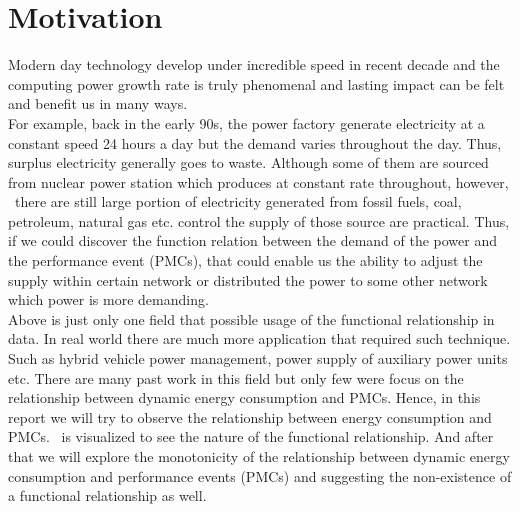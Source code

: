 \section{Motivation}
Modern day technology develop under incredible speed in recent decade and the computing power growth rate is truly phenomenal and lasting impact can be felt and benefit us in many ways.\\
For example, back in the early 90s, the power factory generate electricity at a constant speed 24 hours a day but the demand varies throughout the day. Thus, surplus electricity generally goes to waste. Although some of them are sourced from nuclear power station which produces at constant rate throughout, however,  there are still large portion of electricity generated from fossil fuels, coal, petroleum, natural gas etc. control the supply of those source are practical. Thus, if we could discover the function relation between the demand of the power and the performance event (PMCs), that could enable us the ability to adjust the supply within certain network or distributed the power to some other network which power is more demanding.\\
Above is just only one field that possible usage of the functional relationship in data. In real world there are much more application that required such technique. Such as hybrid vehicle power management, power supply of auxiliary power units etc. There are many past work in this field but only few were focus on the relationship between dynamic energy consumption and PMCs. Hence, in this report we will try to observe the relationship between energy consumption and PMCs.  is visualized to see the nature of the functional relationship. And after that we will explore the monotonicity of the relationship between dynamic energy consumption and performance events (PMCs) and suggesting the non-existence of a functional relationship as well.

